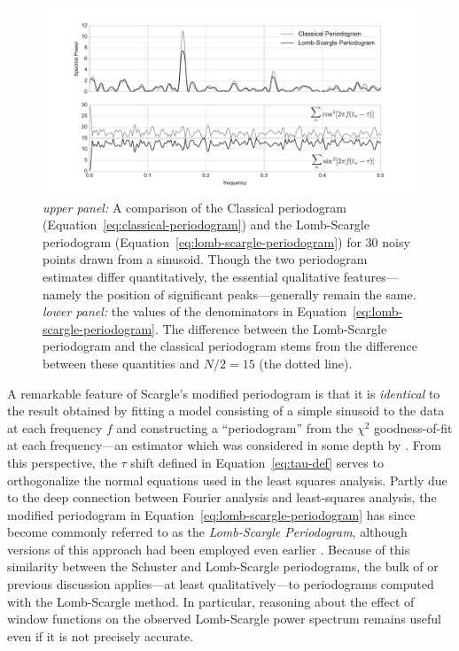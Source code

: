 \documentclass[preprint]{aastex}
\newcommand{\figlabel}[1]{\label{fig:#1}}
\newcommand{\Eq}[1]{Equation~\ref{eq:#1}}
\newcommand{\eq}[1]{\Eq{#1}}
\begin{document}
\begin{figure}[ht]
  \centering
  \includegraphics[width=\textwidth]{fig17_ls_comparison}
  \caption{{\it upper panel:} A comparison of the Classical periodogram
    (\eq{classical-periodogram}) and the Lomb-Scargle periodogram
    (\eq{lomb-scargle-periodogram}) for 30 noisy points drawn from a sinusoid.
    Though the two periodogram estimates differ quantitatively, the essential
    qualitative features---namely the position of significant peaks---generally
    remain the same.
    {\it lower panel:} the values of the denominators in
    \eq{lomb-scargle-periodogram}.
    The difference between the Lomb-Scargle periodogram and the classical
    periodogram stems from the difference between these quantities
    and $N/2 = 15$ (the dotted line).
    \figlabel{ls-comparison}}
\end{figure}

A remarkable feature of Scargle's modified periodogram is that it is
{\it identical} to the result
obtained by fitting a model consisting of a simple sinusoid to the data at
each frequency $f$ and
constructing a ``periodogram'' from the $\chi^2$ goodness-of-fit at each
frequency---an estimator which was considered in some depth by \citet{Lomb76}.
From this perspective, the $\tau$ shift defined in \eq{tau-def} serves to
orthogonalize the normal equations used in the least squares analysis.
Partly due to the deep connection between Fourier analysis and least-squares
analysis, the modified periodogram in \eq{lomb-scargle-periodogram}
has since become commonly referred to as the {\it Lomb-Scargle Periodogram},
although versions of this approach had been employed even earlier
\citep[see, e.g.][]{Gottlieb75}.
Because of this similarity between the Schuster and Lomb-Scargle periodograms,
the bulk of or previous discussion applies---at least qualitatively---to
periodograms computed with the Lomb-Scargle method.
In particular, reasoning about the effect of window functions on the observed
Lomb-Scargle power spectrum remains useful even if it is not precisely
accurate.
\end{document}
